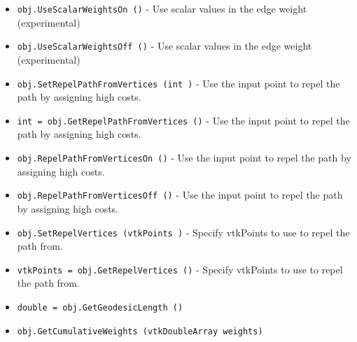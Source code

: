 \begin{itemize}
\item  \verb|obj.UseScalarWeightsOn ()| -  Use scalar values in the edge weight (experimental)

\item  \verb|obj.UseScalarWeightsOff ()| -  Use scalar values in the edge weight (experimental)

\item  \verb|obj.SetRepelPathFromVertices (int )| -  Use the input point to repel the path by assigning high costs.

\item  \verb|int = obj.GetRepelPathFromVertices ()| -  Use the input point to repel the path by assigning high costs.

\item  \verb|obj.RepelPathFromVerticesOn ()| -  Use the input point to repel the path by assigning high costs.

\item  \verb|obj.RepelPathFromVerticesOff ()| -  Use the input point to repel the path by assigning high costs.

\item  \verb|obj.SetRepelVertices (vtkPoints )| -  Specify vtkPoints to use to repel the path from.

\item  \verb|vtkPoints = obj.GetRepelVertices ()| -  Specify vtkPoints to use to repel the path from.

\item  \verb|double = obj.GetGeodesicLength ()|

\item  \verb|obj.GetCumulativeWeights (vtkDoubleArray weights)|

\end{itemize}
